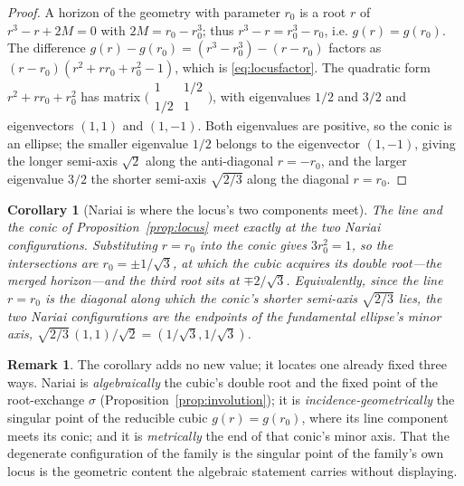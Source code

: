 \documentclass[11pt,a4paper]{article}
\newtheorem{corollary}[theorem]{Corollary}
\theoremstyle{definition}
\newtheorem{remark}[theorem]{Remark}
\begin{document}
\begin{proof}
A horizon of the geometry with parameter $r_{0}$ is a root $r$ of $r^{3}-r+2M=0$ with $2M=r_{0}-r_{0}^{3}$; thus $r^{3}-r=r_{0}^{3}-r_{0}$, i.e. $g(r)=g(r_{0})$. The difference $g(r)-g(r_{0})=(r^{3}-r_{0}^{3})-(r-r_{0})$ factors as $(r-r_{0})(r^{2}+r r_{0}+r_{0}^{2}-1)$, which is \eqref{eq:locusfactor}. The quadratic form $r^{2}+r r_{0}+r_{0}^{2}$ has matrix $\bigl(\begin{smallmatrix}1&1/2\\1/2&1\end{smallmatrix}\bigr)$, with eigenvalues $1/2$ and $3/2$ and eigenvectors $(1,1)$ and $(1,-1)$. Both eigenvalues are positive, so the conic is an ellipse; the smaller eigenvalue $1/2$ belongs to the eigenvector $(1,-1)$, giving the longer semi-axis $\sqrt{2}$ along the anti-diagonal $r=-r_{0}$, and the larger eigenvalue $3/2$ the shorter semi-axis $\sqrt{2/3}$ along the diagonal $r=r_{0}$.
\end{proof}

\begin{corollary}[Nariai is where the locus's two components meet]\label{cor:nariai-locus}
The line and the conic of Proposition~\ref{prop:locus} meet exactly at the two Nariai
configurations. Substituting $r=r_{0}$ into the conic gives $3r_{0}^{2}=1$, so the
intersections are $r_{0}=\pm1/\sqrt3$, at which the cubic acquires its double root---the
merged horizon---and the third root sits at $\mp2/\sqrt3$. Equivalently, since the line
$r=r_{0}$ is the diagonal along which the conic's shorter semi-axis $\sqrt{2/3}$ lies, the two
Nariai configurations are the endpoints of the fundamental ellipse's minor
axis, $\sqrt{2/3}\,(1,1)/\sqrt2=(1/\sqrt3,1/\sqrt3)$.
\end{corollary}

\begin{remark}
The corollary adds no new value; it locates one already fixed three ways. Nariai is
\emph{algebraically} the cubic's double root and the fixed point of the root-exchange
$\sigma$ (Proposition~\ref{prop:involution}); it is \emph{incidence-geometrically} the singular
point of the reducible cubic $g(r)=g(r_{0})$, where its line component meets its conic; and it
is \emph{metrically} the end of that conic's minor axis. That the degenerate configuration of
the family is the singular point of the family's own locus is the geometric content the
algebraic statement carries without displaying.
\end{remark}
\end{document}
